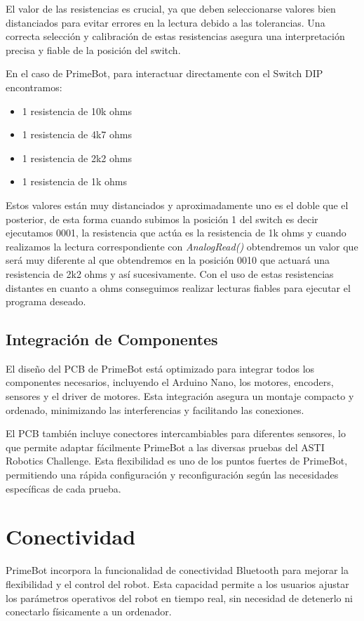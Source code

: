 El valor de las resistencias es crucial, ya que deben seleccionarse valores bien distanciados para evitar errores en la lectura debido a las tolerancias. Una correcta selección y calibración de estas resistencias asegura una interpretación precisa y fiable de la posición del switch.

En el caso de PrimeBot, para interactuar directamente con el Switch DIP encontramos:
\begin{itemize}
	\item 1 resistencia de 10k ohms
	\item 1 resistencia de 4k7 ohms
	\item 1 resistencia de 2k2 ohms
	\item 1 resistencia de 1k ohms
\end{itemize}

Estos valores están muy distanciados y aproximadamente uno es el doble que el posterior, de esta forma cuando subimos la posición 1 del switch es decir ejecutamos 0001, la resistencia que actúa es la resistencia de 1k ohms y cuando realizamos la lectura correspondiente con \emph{AnalogRead()} obtendremos un valor que será muy diferente al que obtendremos en la posición 0010 que actuará una resistencia de 2k2 ohms y así sucesivamente.
Con el uso de estas resistencias distantes en cuanto a ohms conseguimos realizar lecturas fiables para ejecutar el programa deseado.

\subsection{Integración de Componentes}
El diseño del PCB de PrimeBot está optimizado para integrar todos los componentes necesarios, incluyendo el Arduino Nano, los motores, encoders, sensores y el driver de motores. Esta integración asegura un montaje compacto y ordenado, minimizando las interferencias y facilitando las conexiones.

El PCB también incluye conectores intercambiables para diferentes sensores, lo que permite adaptar fácilmente PrimeBot a las diversas pruebas del ASTI Robotics Challenge. Esta flexibilidad es uno de los puntos fuertes de PrimeBot, permitiendo una rápida configuración y reconfiguración según las necesidades específicas de cada prueba.

\section{Conectividad}\label{conectividad}
PrimeBot incorpora la funcionalidad de conectividad Bluetooth para mejorar la flexibilidad y el control del robot. Esta capacidad permite a los usuarios ajustar los parámetros operativos del robot en tiempo real, sin necesidad de detenerlo ni conectarlo físicamente a un ordenador.

